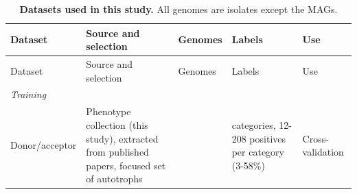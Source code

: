 \documentclass[10pt,a4paper,onecolumn]{article}
\begin{document}
{\begin{longtable}[]{@{}
  >{\raggedright\arraybackslash}p{}
  >{\raggedright\arraybackslash}p{}
  >{\raggedright\arraybackslash}p{}
  >{\raggedright\arraybackslash}p{}
  >{\raggedright\arraybackslash}p{}@{}}
\caption{\textbf{Datasets used in this study.} All genomes are isolates
except the MAGs. \label{tab:s_datasets}}\tabularnewline
\toprule\noalign{}
\begin{minipage}[b]{\linewidth}\raggedright
Dataset
\end{minipage} & \begin{minipage}[b]{\linewidth}\raggedright
Source and selection
\end{minipage} & \begin{minipage}[b]{\linewidth}\raggedright
Genomes
\end{minipage} & \begin{minipage}[b]{\linewidth}\raggedright
Labels
\end{minipage} & \begin{minipage}[b]{\linewidth}\raggedright
Use
\end{minipage} \\
\midrule\noalign{}
\endfirsthead
\toprule\noalign{}
\begin{minipage}[b]{\linewidth}\raggedright
Dataset
\end{minipage} & \begin{minipage}[b]{\linewidth}\raggedright
Source and selection
\end{minipage} & \begin{minipage}[b]{\linewidth}\raggedright
Genomes
\end{minipage} & \begin{minipage}[b]{\linewidth}\raggedright
Labels
\end{minipage} & \begin{minipage}[b]{\linewidth}\raggedright
Use
\end{minipage} \\
\midrule\noalign{}
\endhead
\bottomrule\noalign{}
\endlastfoot
\emph{Training} & & & & \\*
\quad Donor/acceptor & Phenotype collection (this study), extracted from
published papers, focused set of autotrophs & 358 & 14 categories,
12-208 positives per category (3-58\%) & Cross-validation \\

\end{longtable}}
\end{document}
